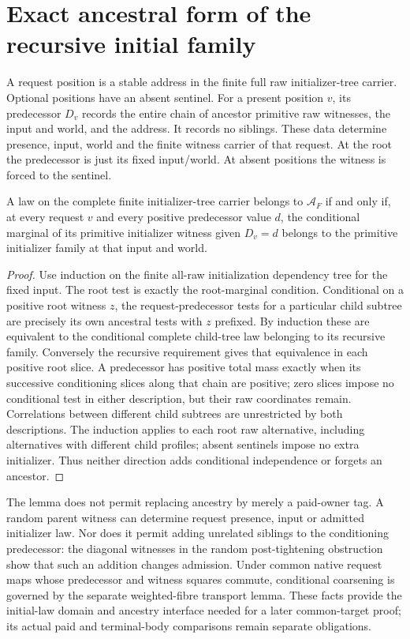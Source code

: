 \documentclass[11pt]{article}
\begin{document}
\section{Exact ancestral form of the recursive initial family}
A request position is a stable address in the finite full raw initializer-tree carrier. Optional positions have an absent sentinel. For a present position $v$, its predecessor $D_v$ records the entire chain of ancestor primitive raw witnesses, the input and world, and the address. It records no siblings. These data determine presence, input, world and the finite witness carrier of that request. At the root the predecessor is just its fixed input/world. At absent positions the witness is forced to the sentinel.

\begin{lemma}
A law on the complete finite initializer-tree carrier belongs to $\mathcal A_F$ if and only if, at every request $v$ and every positive predecessor value $d$, the conditional marginal of its primitive initializer witness given $D_v=d$ belongs to the primitive initializer family at that input and world.
\end{lemma}
\begin{proof}
Use induction on the finite all-raw initialization dependency tree for the fixed input. The root test is exactly the root-marginal condition. Conditional on a positive root witness $z$, the request-predecessor tests for a particular child subtree are precisely its own ancestral tests with $z$ prefixed. By induction these are equivalent to the conditional complete child-tree law belonging to its recursive family. Conversely the recursive requirement gives that equivalence in each positive root slice. A predecessor has positive total mass exactly when its successive conditioning slices along that chain are positive; zero slices impose no conditional test in either description, but their raw coordinates remain. Correlations between different child subtrees are unrestricted by both descriptions. The induction applies to each root raw alternative, including alternatives with different child profiles; absent sentinels impose no extra initializer. Thus neither direction adds conditional independence or forgets an ancestor.
\end{proof}

The lemma does not permit replacing ancestry by merely a paid-owner tag. A random parent witness can determine request presence, input or admitted initializer law. Nor does it permit adding unrelated siblings to the conditioning predecessor: the diagonal witnesses in the random post-tightening obstruction show that such an addition changes admission. Under common native request maps whose predecessor and witness squares commute, conditional coarsening is governed by the separate weighted-fibre transport lemma. These facts provide the initial-law domain and ancestry interface needed for a later common-target proof; its actual paid and terminal-body comparisons remain separate obligations.
\end{document}
